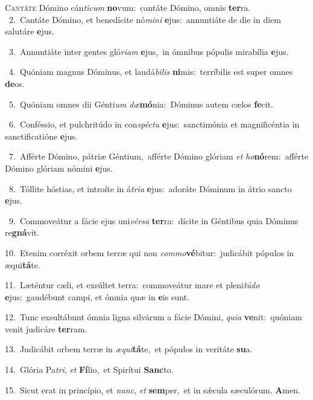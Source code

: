 \lettrine{\initial\textcolor{\initialcolor}{C}}{antáte} Dómino cán\-\textit{ti}\-\textit{cum} \textbf{no}\-vum:~\star cantáte Dómino, omnis \textbf{ter}\-ra.\\
{\numbfont\textcolor{\numbcolor}{~2.}}~Cantáte Dómino, et benedícite nó\-\textit{mi}\-\textit{ni} \textbf{e}\-jus:~\star annuntiáte de die in diem salutáre \textbf{e}\-jus.\par
{\numbfont\textcolor{\numbcolor}{~3.}}~Annuntiáte inter gentes gló\-\textit{ri}\-\textit{am} \textbf{e}\-jus,~\star in ómnibus pópulis mirabília \textbf{e}\-jus.\par
{\numbfont\textcolor{\numbcolor}{~4.}}~Quóniam magnus Dóminus, et laudá\-\textit{bi}\-\textit{lis} \textbf{ni}\-mis:~\star terríbilis est super omnes \textbf{de}\-os.\par
{\numbfont\textcolor{\numbcolor}{~5.}}~Quóniam omnes dii Génti\textit{um} \textit{dæ}\-\textbf{mó}nia:~\star Dóminus autem cælos \textbf{fe}\-cit.\par
{\numbfont\textcolor{\numbcolor}{~6.}}~Conféssio, et pulchritúdo in con\-\textit{spéc}\-\textit{tu} \textbf{e}\-jus:~\star sanctimónia et magnificéntia in sanctificatióne \textbf{e}\-jus.\par
{\numbfont\textcolor{\numbcolor}{~7.}}~Afférte Dómino, pátriæ Géntium,~\dagger afférte Dómino glóriam \textit{et} \textit{ho}\-\textbf{nó}rem:~\star afférte Dómino glóriam nómini \textbf{e}\-jus.\par
{\numbfont\textcolor{\numbcolor}{~8.}}~Tóllite hóstias, et introíte in á\-\textit{tri}\-\textit{a} \textbf{e}\-jus:~\star adoráte Dóminum in átrio sancto \textbf{e}\-jus.\par
{\numbfont\textcolor{\numbcolor}{~9.}}~Commoveátur a fácie ejus uni\-\textit{vér}\-\textit{sa} \textbf{ter}\-ra:~\star dícite in Géntibus quia Dóminus re\-\textbf{gná}\-vit.\par
{\numbfont\textcolor{\numbcolor}{10.}}~Etenim corréxit orbem terræ qui non \textit{com}\-\textit{mo}\textbf{vé}bitur:~\star judicábit pópulos in æqui\-\textbf{tá}\-te.\par
{\numbfont\textcolor{\numbcolor}{11.}}~Læténtur cæli, et exsúltet terra:~\dagger commoveátur mare et pleni\-\textit{tú}\-\textit{do} \textbf{e}\-jus:~\star gaudébunt campi, et ómnia quæ in \textbf{e}\-is sunt.\par
{\numbfont\textcolor{\numbcolor}{12.}}~Tunc exsultábunt ómnia ligna silvárum a fácie Dómini, \textit{qui}\-\textit{a} \textbf{ve}\-nit:~\star quóniam venit judicáre \textbf{ter}\-ram.\par
{\numbfont\textcolor{\numbcolor}{13.}}~Judicábit orbem terræ in \textit{æ}\-\textit{qui}\textbf{tá}te,~\star et pópulos in veritáte \textbf{su}\-a.\par
{\numbfont\textcolor{\numbcolor}{14.}}~Glória Pa\-\textit{tri}\-, \textit{et} \textbf{Fí}\-lio,~\star et Spirítui \textbf{Sanc}\-to.\par
{\numbfont\textcolor{\numbcolor}{15.}}~Sicut erat in princípio, et \textit{nunc}\-, \textit{et} \textbf{sem}\-per,~\star et in sǽcula sæculórum. \textbf{A}\-men.\par

